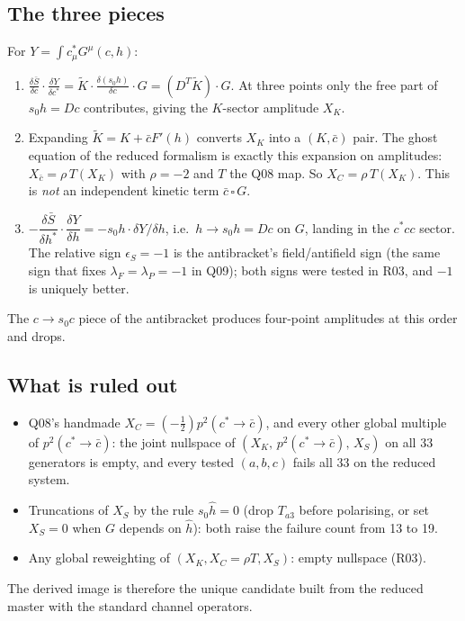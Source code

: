 \documentclass[11pt]{article}
\begin{document}
\subsection{The three pieces}
For $Y=\int c^*_\mu G^\mu(c,h)$:
\begin{enumerate}
\item $\displaystyle\frac{\delta\bar S}{\delta c}\cdot\frac{\delta Y}{\delta c^*}
      = \tilde K\cdot\frac{\delta(s_0h)}{\delta c}\cdot G =(D^T\tilde K)\cdot G$.
      At three points only the free part of $s_0h=Dc$ contributes, giving the $K$-sector amplitude $X_K$.
\item Expanding $\tilde K=K+\bar c F'(h)$ converts $X_K$ into a $(K,\bar c)$ pair. The ghost equation of the reduced
      formalism is exactly this expansion on amplitudes: $X_{\bar c}=\rho\,T(X_K)$ with $\rho=-2$ and $T$ the Q08 map.
      So $X_C=\rho\,T(X_K)$. This is \emph{not} an independent kinetic term $\bar c\,\square\,G$.
\item $-\dfrac{\delta\bar S}{\delta h^*}\cdot\dfrac{\delta Y}{\delta h} = -s_0h\cdot\delta Y/\delta h$, i.e.\ $h\to s_0h=Dc$
      on $G$, landing in the $c^*cc$ sector. The relative sign $\epsilon_S=-1$ is the antibracket's field/antifield sign
      (the same sign that fixes $\lambda_F=\lambda_P=-1$ in Q09); both signs were tested in R03, and $-1$ is uniquely better.
\end{enumerate}
The $c\to s_0c$ piece of the antibracket produces four-point amplitudes at this order and drops.

\subsection{What is ruled out}
\begin{itemize}
\item Q08's handmade $X_C=(-\tfrac12)p^2(c^*\to\bar c)$, and every other global multiple of $p^2(c^*\to\bar c)$: the
      joint nullspace of $(X_K,\,p^2(c^*\to\bar c),\,X_S)$ on all 33 generators is empty, and every tested $(a,b,c)$ fails
      all 33 on the reduced system.
\item Truncations of $X_S$ by the rule $s_0\hat h=0$ (drop $T_{a3}$ before polarising, or set $X_S=0$ when $G$ depends on
      $\hat h$): both raise the failure count from 13 to 19.
\item Any global reweighting of $(X_K,X_C{=}\rho T,X_S)$: empty nullspace (R03).
\end{itemize}
The derived image is therefore the unique candidate built from the reduced master with the standard channel operators.
\end{document}
